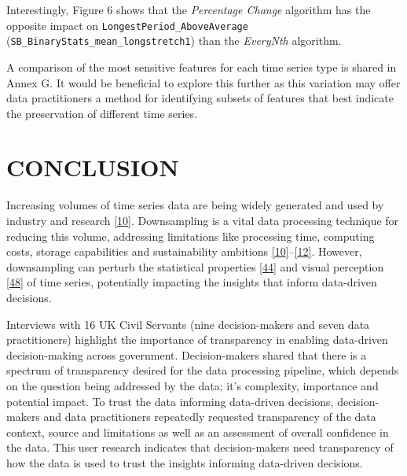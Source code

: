 \documentclass{article}
\begin{document}
Interestingly, Figure 6 shows that the \emph{Percentage Change}
algorithm has the opposite impact on
\texttt{LongestPeriod\_AboveAverage}
(\texttt{SB\_BinaryStats\_mean\_longstretch1}) than the \emph{EveryNth}
algorithm.

A comparison of the most sensitive features for each time series type is
shared in Annex G. It would be beneficial to explore this further as
this variation may offer data practitioners a method for identifying
subsets of features that best indicate the preservation of different
time series.

\hypertarget{conclusion}{%
\section{CONCLUSION}\label{conclusion}}

Increasing volumes of time series data are being widely generated and
used by industry and research \protect\hyperlink{ref-TVStore}{{[}10{]}}.
Downsampling is a vital data processing technique for reducing this
volume, addressing limitations like processing time, computing costs,
storage capabilities and sustainability ambitions
\protect\hyperlink{ref-TVStore}{{[}10{]}}--\protect\hyperlink{ref-Shift}{{[}12{]}}.
However, downsampling can perturb the statistical properties
\protect\hyperlink{ref-ATIChangePoint}{{[}44{]}} and visual perception
\protect\hyperlink{ref-graphsampling}{{[}48{]}} of time series,
potentially impacting the insights that inform data-driven decisions.

Interviews with 16 UK Civil Servants (nine decision-makers and seven
data practitioners) highlight the importance of transparency in enabling
data-driven decision-making across government. Decision-makers shared
that there is a spectrum of transparency desired for the data processing
pipeline, which depends on the question being addressed by the data;
it's complexity, importance and potential impact. To trust the data
informing data-driven decisions, decision-makers and data practitioners
repeatedly requested transparency of the data context, source and
limitations as well as an assessment of overall confidence in the data.
This user research indicates that decision-makers need transparency of
how the data is used to trust the insights informing data-driven
decisions.
\end{document}
